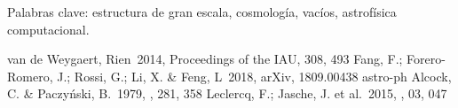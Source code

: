 \documentclass[manuscript]{aastex62}
\begin{document}
  \medskip

  Palabras clave: estructura de gran escala, cosmolog\'ia, vac\'ios,
  astrof\'isica computacional.

\nocite{*}


\begin{thebibliography}{}                                                       

 van de Weygaert, Rien\ 2014, Proceedings of the IAU, 308, 493   
 Fang, F.; Forero-Romero, J.; Rossi, G.; Li, X. \& Feng, L\ 2018, arXiv, 1809.00438 astro-ph
 Alcock, C. \& Paczy\'nski, B.\ 1979, \nat, 281, 358
 Leclercq, F.; Jasche, J. et al.\ 2015, \jcap, 03, 047
                                                                                
\end{thebibliography}                                                           
                       

\end{document}
